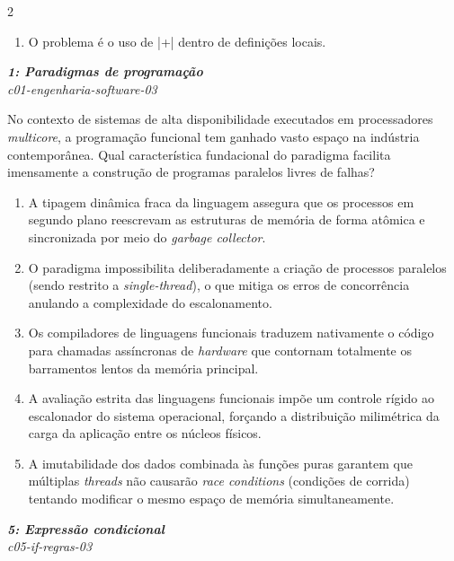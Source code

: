 \documentclass[a4paper,10pt,brazil]{article}
\begin{document}
\begin{multicols}{2}
\begin{enumerate}
  \item O problema é o uso de \haskellinline|+| dentro de definições locais.


\end{enumerate}

\begin{flushright}
  \footnotesize
  \textit{\textbf{1: Paradigmas de programação}}\\
  \textit{c01-engenharia-software-03}\\

\end{flushright}
No contexto de sistemas de alta disponibilidade executados em processadores \emph{multicore}, a programação funcional tem ganhado vasto espaço na indústria contemporânea. Qual característica fundacional do paradigma facilita imensamente a construção de programas paralelos livres de falhas?

\begin{enumerate}
  \item A tipagem dinâmica fraca da linguagem assegura que os processos em segundo plano reescrevam as estruturas de memória de forma atômica e sincronizada por meio do \emph{garbage collector}.

  \item O paradigma impossibilita deliberadamente a criação de processos paralelos (sendo restrito a \emph{single-thread}), o que mitiga os erros de concorrência anulando a complexidade do escalonamento.

  \item Os compiladores de linguagens funcionais traduzem nativamente o código para chamadas assíncronas de \emph{hardware} que contornam totalmente os barramentos lentos da memória principal.

  \item A avaliação estrita das linguagens funcionais impõe um controle rígido ao escalonador do sistema operacional, forçando a distribuição milimétrica da carga da aplicação entre os núcleos físicos.

  \item A imutabilidade dos dados combinada às funções puras garantem que múltiplas \emph{threads} não causarão \emph{race conditions} (condições de corrida) tentando modificar o mesmo espaço de memória simultaneamente.


\end{enumerate}

\begin{flushright}
  \footnotesize
  \textit{\textbf{5: Expressão condicional}}\\
  \textit{c05-if-regras-03}\\


\end{flushright}
\end{multicols}
\end{document}
